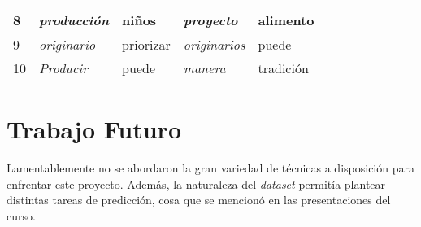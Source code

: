 \documentclass[
	spanish, %
	letterpaper, oneside
]{article}
\begin{document}
\begin{table}[htbp]
\begin{tabular}{l|llll|}
        \multicolumn{1}{|l|}{8}                            & \multicolumn{1}{l|}{\textit{producción}}        & \multicolumn{1}{l|}{niños}                      & \multicolumn{1}{l|}{\textit{proyecto}}          & alimento                  \\ \hline
        \multicolumn{1}{|l|}{9}                            & \multicolumn{1}{l|}{\textit{originario}}        & \multicolumn{1}{l|}{priorizar}                  & \multicolumn{1}{l|}{\textit{originarios}}       & puede                     \\ \hline
        \multicolumn{1}{|l|}{10}                           & \multicolumn{1}{l|}{\textit{Producir}}          & \multicolumn{1}{l|}{puede}                      & \multicolumn{1}{l|}{\textit{manera}}            & tradición                 \\ \hline
        \end{tabular}
    \label{tab:topicos}
\end{table}



\section{Trabajo Futuro}

Lamentablemente no se abordaron la gran variedad de técnicas a disposición para enfrentar este proyecto. Además, la naturaleza del \textit{dataset} permitía plantear distintas tareas de predicción, cosa que se mencionó en las presentaciones del curso.
\end{document}
